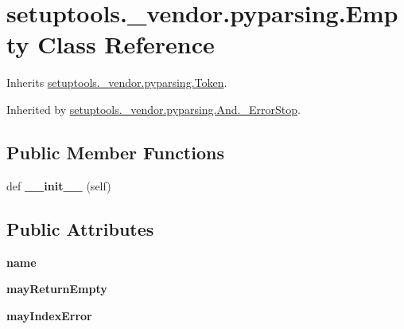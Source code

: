 \hypertarget{classsetuptools_1_1__vendor_1_1pyparsing_1_1_empty}{}\section{setuptools.\+\_\+vendor.\+pyparsing.\+Empty Class Reference}
\label{classsetuptools_1_1__vendor_1_1pyparsing_1_1_empty}


Inherits \hyperlink{classsetuptools_1_1__vendor_1_1pyparsing_1_1_token}{setuptools.\+\_\+vendor.\+pyparsing.\+Token}.



Inherited by \hyperlink{classsetuptools_1_1__vendor_1_1pyparsing_1_1_and_1_1___error_stop}{setuptools.\+\_\+vendor.\+pyparsing.\+And.\+\_\+\+Error\+Stop}.

\subsection*{Public Member Functions}
\begin{DoxyCompactItemize}
\item 
\mbox{\label{classsetuptools_1_1__vendor_1_1pyparsing_1_1_empty_a703b5a8a25b893abaee8efba515447ae}} 
def {\bfseries \+\_\+\+\_\+init\+\_\+\+\_\+} (self)
\end{DoxyCompactItemize}
\subsection*{Public Attributes}
\begin{DoxyCompactItemize}
\item 
\mbox{\label{classsetuptools_1_1__vendor_1_1pyparsing_1_1_empty_aea859e714663ba5714a0de67f63f6635}} 
{\bfseries name}
\item 
\mbox{\label{classsetuptools_1_1__vendor_1_1pyparsing_1_1_empty_a8a9d4830850f2dd7112bba33f20afa9c}} 
{\bfseries may\+Return\+Empty}
\item 
\mbox{\label{classsetuptools_1_1__vendor_1_1pyparsing_1_1_empty_a4c35fde0f15a14a91273efac7973c400}} 
{\bfseries may\+Index\+Error}
\end{DoxyCompactItemize}
